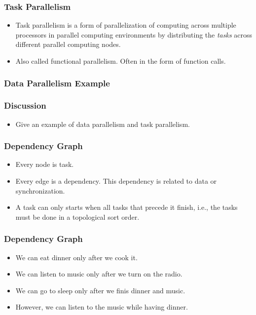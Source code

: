 \documentclass{beamer}
\begin{document}
\begin{CJK}{UTF8}{bsmi}
\begin{frame}
\frametitle{Task Parallelism} 
\begin{itemize}
\item Task parallelism is a form of parallelization of computing
  across multiple processors in parallel computing environments by
  distributing the {\em tasks} across different parallel computing
  nodes.
\item Also called functional parallelism.  Often in the form of
  function calls.
\end{itemize}
\end{frame}

\begin{frame}
\frametitle{Data Parallelism Example}
\end{frame}


\begin{frame}
\frametitle{Discussion} 
\begin{itemize}
\item Give an example of data parallelism and task parallelism.
\end{itemize}
\end{frame}


\begin{frame}
\frametitle{Dependency Graph}
\begin{itemize}
\item Every node is task.
\item Every edge is a dependency.  This dependency is related to data
  or synchronization.
\item A task can only starts when all tasks that precede it finish,
  i.e., the tasks must be done in a topological sort order.
\end{itemize}
\end{frame}

\begin{frame}
\frametitle{Dependency Graph}
\begin{itemize}
\item We can eat dinner only after we cook it. 
\item We can listen to music only after we turn on the radio.
\item We can go to sleep only after we finis dinner and music.
\item However, we can listen to the music while having dinner.
\end{itemize}
\end{frame}


\end{CJK}
\end{document}
